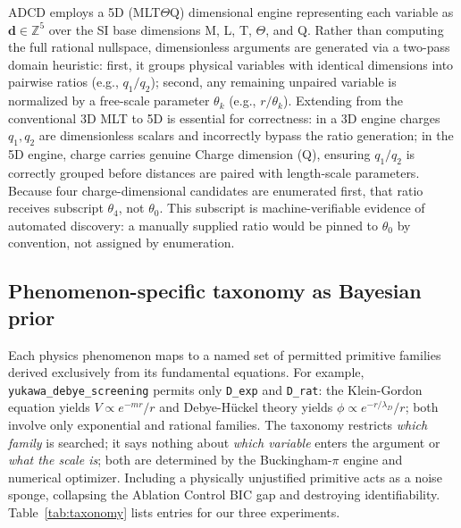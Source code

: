 \documentclass{article}
\begin{document}
ADCD employs a 5D (MLT$\Theta$Q) dimensional engine representing each
variable as $\mathbf{d}\in\mathbb{Z}^5$ over the SI base dimensions M, L, T,
$\Theta$, and Q.
Rather than computing the full rational nullspace, dimensionless arguments are generated via a two-pass domain heuristic: 
first, it groups physical variables with identical dimensions into pairwise ratios (e.g., $q_1/q_2$); 
second, any remaining unpaired variable is normalized by a free-scale parameter $\theta_k$ (e.g., $r/\theta_k$).
Extending from the conventional 3D MLT to 5D is essential for correctness:
in a 3D engine charges $q_1,q_2$ are dimensionless scalars and incorrectly bypass the ratio generation;
in the 5D engine, charge carries genuine Charge dimension (Q), ensuring $q_1/q_2$ is correctly grouped before distances are paired with length-scale parameters.
Because four charge-dimensional candidates are enumerated first, that ratio
receives subscript $\theta_4$, not $\theta_0$.
This subscript is machine-verifiable evidence of automated discovery:
a manually supplied ratio would be pinned to $\theta_0$ by convention,
not assigned by enumeration.

\subsection{Phenomenon-specific taxonomy as Bayesian prior}
\label{sec:taxonomy}

Each physics phenomenon maps to a named set of permitted primitive families
derived exclusively from its fundamental equations.
For example, \texttt{yukawa\_debye\_screening} permits only \texttt{D\_exp}
and \texttt{D\_rat}: the Klein-Gordon equation yields $V\propto e^{-mr}/r$ and
Debye-H\"{u}ckel theory yields $\phi\propto e^{-r/\lambda_D}/r$; both involve
only exponential and rational families.
The taxonomy restricts \emph{which family} is searched; it says nothing about
\emph{which variable} enters the argument or \emph{what the scale is}; both
are determined by the Buckingham-$\pi$ engine and numerical optimizer.
Including a physically unjustified primitive acts as a noise sponge, collapsing
the Ablation Control BIC gap and destroying identifiability.
Table~\ref{tab:taxonomy} lists entries for our three experiments.
\end{document}
